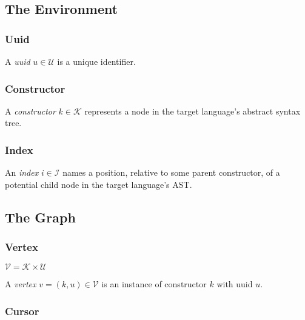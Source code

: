 \documentclass[letterpaper,12pt]{article}
\def\I{\mathcal{I}}
\def\K{\mathcal{K}}
\def\U{\mathcal{U}}
\def\V{\mathcal{V}}
\begin{document}
\subsection{The Environment}
\label{sec:the-environment}

\subsubsection{Uuid}
\label{sec:uuid}

A \emph{uuid} $u \in \U$ is a unique identifier.


\subsubsection{Constructor}
\label{sec:constructor}

A \emph{constructor} $k \in \K$ represents a node in the target language's
abstract syntax tree.

\subsubsection{Index}
\label{sec:index}

An \emph{index} $i \in \I$ names a position, relative to some parent
constructor, of a potential child node in the target language's AST.


\subsection{The Graph}
\label{sec:the-graph}


\subsubsection{Vertex}
\label{sec:vertex}

$\V = \K \times \U$

A \emph{vertex} $v = (k, u) \in \V$ is an instance of constructor $k$ with
uuid $u$.


\subsubsection{Cursor}
\label{sec:cursor}
\end{document}
